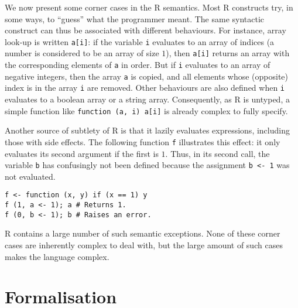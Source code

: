 \documentclass[9pt, sigplan, natbib=false, screen=true]{acmart}
\newcommand\R{R}
\begin{document}
We now present some corner cases in the \R{} semantics.
Most \R{} constructs
try, in some ways, to ``guess'' what the programmer meant.
The same syntactic construct can thus be associated
with different behaviours.
For instance, array look-up is written \texttt{a[i]}:
if the variable \texttt{i} evaluates to an array of indices
(a number is considered to be an array of size \(1\)),
then \texttt{a[i]} returns an array with
the corresponding elements of \texttt{a} in order.
But if \texttt{i} evaluates to an array of negative integers,
then the array \texttt{a} is copied,
and all elements whose (opposite) index is in the array \texttt{i}
are removed.
Other behaviours are also defined when \texttt{i}
evaluates to a boolean array or a string array.
Consequently,
as \R{} is untyped,
a simple function like \texttt{function (a, i) a[i]}
is already complex to fully specify.

Another source of subtlety of \R{} is that it lazily evaluates expressions,
including those with side effects.
The following function \texttt{f} illustrates this effect:
it only evaluates its second argument if the first is \(1\).
Thus, in its second call, the variable \texttt{b}
has confusingly not been defined because the assignment \texttt{b <- 1}
was not evaluated.
\begin{verbatim}
f <- function (x, y) if (x == 1) y
f (1, a <- 1); a # Returns 1.
f (0, b <- 1); b # Raises an error.
\end{verbatim}

\R{} contains a large number of such semantic exceptions.
None of these corner cases are inherently complex to deal with,
but the large amount of such cases makes the language complex.


\section{Formalisation}
\label{sec:formalisation}
\end{document}

